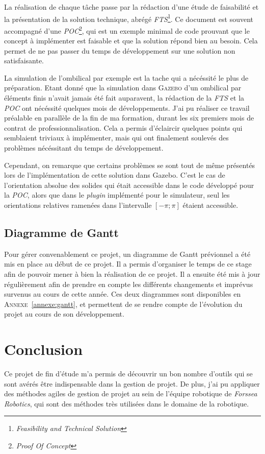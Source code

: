 			La réalisation de chaque tâche passe par la rédaction d'une étude de faisabilité et la présentation de la solution technique, abrégé \textit{FTS}\footnote{\textit{Feasibility and Technical Solution}}. Ce document est souvent accompagné d'une \textit{POC}\footnote{\textit{Proof Of Concept}}, qui est un exemple minimal de code prouvant que le concept à implémenter est faisable et que la solution répond bien au besoin. Cela permet de ne pas passer du temps de développement sur une solution non satisfaisante.

			La simulation de l'ombilical par exemple est la tache qui a nécéssité le plus de préparation. Etant donné que la simulation dans \textsc{Gazebo} d'un ombilical par éléments finis n'avait jamais été fait auparavent, la rédaction de la \textit{FTS} et la \textit{POC} ont nécéssité quelques mois de développements. J'ai pu réaliser ce travail préalable en parallèle de la fin de ma formation, durant les six premiers mois de contrat de professionnalisation. Cela a permis d'éclaircir quelques points qui semblaient triviaux à implémenter, mais qui ont finalement soulevés des problèmes nécéssitant du temps de développement. 
			
			Cependant, on remarque que certains problèmes se sont tout de même présentés lors de l'implémentation de cette solution dans \gls{Gazebo}. C'est le cas de l'orientation absolue des solides qui était accessible dans le code développé pour la \textit{POC}, alors que dans le \textit{plugin} implémenté pour le simulateur, seul les orientations relatives ramenées dans l'intervalle $[-\pi; \pi]$ étaient accessible.

		\subsection{Diagramme de Gantt}
			
			Pour gérer convenablement ce projet, un diagramme de Gantt prévionnel a été mis en place au début de ce projet. Il a permis d'organiser le temps de ce stage afin de pouvoir mener à bien la réalisation de ce projet. Il a ensuite été mis à jour régulièrement afin de prendre en compte les différents changements et imprévus survenus au cours de cette année. Ces deux diagrammes sont disponibles en \textsc{Annexe}~\ref{annexe:gantt}, et permettent de se rendre compte de l'évolution du projet au cours de son développement.

	\section{Conclusion}
	
		Ce projet de fin d'étude m'a permis de découvrir un bon nombre d'outils qui se sont avérés être indispensable dans la gestion de projet. De plus, j'ai pu appliquer des méthodes agiles de gestion de projet au sein de l'équipe robotique de \textit{Forssea Robotics}, qui sont des méthodes très utilisées dans le domaine de la robotique.